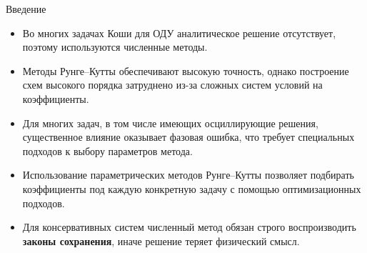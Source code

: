 \begin{frame}{Введение}
	
	\begin{itemize}
		\item Во многих задачах Коши для ОДУ аналитическое решение отсутствует, поэтому используются численные методы.
		
		\vspace{0.125cm}
		
		\item Методы Рунге--Кутты обеспечивают высокую точность, однако построение схем высокого порядка затруднено из-за сложных систем условий на коэффициенты.
		
		\vspace{0.125cm}
		
		\item Для многих задач, в том числе имеющих осциллирующие решения, существенное влияние оказывает фазовая ошибка, что требует специальных подходов к выбору параметров метода.
		
		\vspace{0.125cm}
		
		\item Использование параметрических методов Рунге--Кутты позволяет подбирать коэффициенты под каждую конкретную задачу с помощью оптимизационных подходов.
		
		\vspace{0.125cm}
		
		\item Для консервативных систем численный метод обязан строго воспроизводить \textbf{законы сохранения}, иначе решение теряет физический смысл.
	\end{itemize}
	
\end{frame}